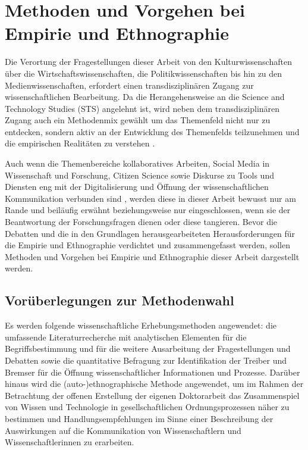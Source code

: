\chapter{Methoden und Vorgehen bei Empirie und Ethnographie}

Die Verortung der Fragestellungen dieser Arbeit von den Kulturwissenschaften über die Wirtschaftswissenschaften, die Politikwissenschaften bis hin zu den Medienwissenschaften, erfordert einen transdisziplinären Zugang zur wissenschaftlichen Bearbeitung. Da die Herangehensweise an die Science and Technology Studies (STS) angelehnt ist, wird neben dem transdisziplinären Zugang auch ein Methodenmix gewählt um das Themenfeld nicht nur zu entdecken, sondern aktiv an der Entwicklung des Themenfelds teilzunehmen \cite{MacKenzie_1999} und die empirischen Realitäten zu verstehen \cite{Kelty_2014}.

Auch wenn die Themenbereiche kollaboratives Arbeiten, Social Media in Wissenschaft und Forschung, Citizen Science sowie Diskurse zu Tools und Diensten eng mit der Digitalisierung und Öffnung der wissenschaftlichen Kommunikation verbunden sind \cite{European_Commission_2015a}, werden diese in dieser Arbeit bewusst nur am Rande und beiläufig erwähnt beziehungsweise nur eingeschlossen, wenn sie der Beantwortung der Forschungsfragen dienen oder diese tangieren. Bevor die Debatten und die in den Grundlagen herausgearbeiteten Herausforderungen für die Empirie und Ethnographie verdichtet und zusammengefasst werden, sollen Methoden und Vorgehen bei Empirie und Ethnographie dieser Arbeit dargestellt werden.

\section{Vorüberlegungen zur Methodenwahl}

Es werden folgende wissenschaftliche Erhebungsmethoden angewendet: die umfassende Literaturrecherche mit analytischen Elementen für die Begriffsbestimmung und für die weitere Ausarbeitung der Fragestellungen und Debatten sowie die quantitative Befragung zur Identifikation der Treiber und Bremser für die Öffnung wissenschaftlicher Informationen und Prozesse. Darüber hinaus wird die (auto-)ethnographische Methode angewendet, um im Rahmen der Betrachtung der offenen Erstellung der eigenen Doktorarbeit das Zusammenspiel von Wissen und Technologie in gesellschaftlichen Ordnungsprozessen näher zu bestimmen und Handlungsempfehlungen im Sinne einer Beschreibung der Auswirkungen auf die Kommunikation von Wissenschaftlern und Wissenschaftlerinnen zu erarbeiten.

